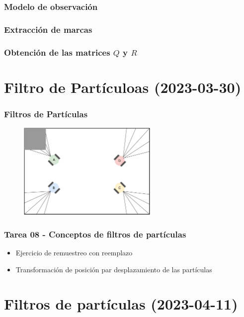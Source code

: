 \begin{frame}\frametitle{Modelo de observación}
\end{frame}

\begin{frame}\frametitle{Extracción de marcas}
\end{frame}

\begin{frame}\frametitle{Obtención de las matrices $Q$ y $R$}
\end{frame}



\section{Filtro de Partículoas (2023-03-30)}
  
\begin{frame}\frametitle{Filtros de Partículas}
  \begin{figure}
    \centering
    \includegraphics[width=0.6\textwidth]{Figures/ParticleFilter1.pdf}
  \end{figure}
\end{frame}

\begin{frame}\frametitle{Tarea 08 - Conceptos de filtros de partículas}
  \begin{itemize}
  \item Ejercicio de remuestreo con reemplazo
  \item Transformación de posición par desplazamiento de las partículas
  \end{itemize}
\end{frame}

\section{Filtros de partículas (2023-04-11)}

